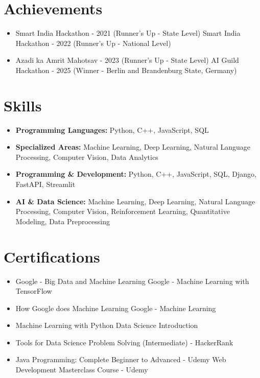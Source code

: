 \documentclass[a4paper,10pt]{article}
\begin{document}
\section*{Achievements}
\begin{itemize}
\item Smart India Hackathon - 2021 (Runner's Up - State Level) \hfill Smart India Hackathon - 2022 (Runner's Up - National Level)
\item Azadi ka Amrit Mahotsav - 2023 (Runner's Up - State Level) \hfill AI Guild Hackathon - 2025 (Winner - Berlin and Brandenburg State, Germany)
\end{itemize}

\section*{Skills}
\begin{itemize}
  \item \textbf{Programming Languages:} Python, C++, JavaScript, SQL
  \item \textbf{Specialized Areas:} Machine Learning, Deep Learning, Natural Language Processing, Computer Vision, Data Analytics
  \item \textbf{Programming \& Development:} Python, C++, JavaScript, SQL, Django, FastAPI, Streamlit
  \item \textbf{AI \& Data Science:} Machine Learning, Deep Learning, Natural Language Processing, Computer Vision, Reinforcement Learning, Quantitative Modeling, Data Preprocessing
\end{itemize}

\section*{Certifications}
\begin{itemize}
\item Google - Big Data and Machine Learning \hfill Google - Machine Learning with TensorFlow
\item How Google does Machine Learning \hfill Google - Machine Learning
\item Machine Learning with Python \hfill Data Science Introduction
\item Tools for Data Science \hfill Problem Solving (Intermediate) - HackerRank
\item Java Programming: Complete Beginner to Advanced - Udemy \hfill Web Development Masterclass Course - Udemy
\end{itemize}
\end{document}
